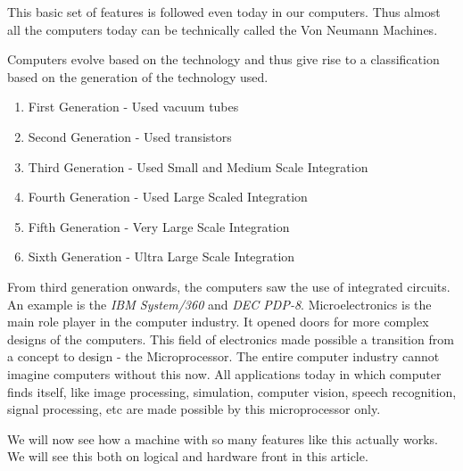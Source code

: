 \documentclass{article}
\begin{document}
This basic set of features is followed even today in our computers. Thus almost all the computers today can be technically called the Von Neumann Machines. 
\par Computers evolve based on the technology and thus give rise to a classification based on the generation of the technology used.
\begin{enumerate}
\item First Generation - Used vacuum tubes 
\item Second Generation - Used transistors
\item Third Generation - Used Small and Medium Scale Integration
\item Fourth Generation - Used Large Scaled Integration
\item Fifth Generation - Very Large Scale Integration
\item Sixth Generation - Ultra Large Scale Integration
\end{enumerate}
From third generation onwards, the computers saw the use of integrated circuits. An example is the \textit{IBM System/360} and \textit{DEC PDP-8}. Microelectronics is the main role player in the computer industry. It opened doors for more complex designs of the computers. This field of electronics made possible a transition from a concept to design - the Microprocessor. The entire computer industry cannot imagine computers without this now. All applications today in which computer finds itself, like image processing, simulation, computer vision, speech recognition, signal processing, etc are made possible by this microprocessor only. \par We will now see how a machine with so many features like this actually works. We will see this both on logical and hardware front in this article. 

\newpage
\end{document}

